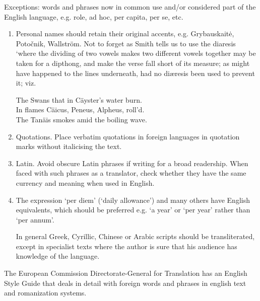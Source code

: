 Exceptions: words and phrases now in common use and/or considered part of
the English language, e.g. role, ad hoc, per capita, per se, etc.

\begin{enumerate}
\item Personal names should retain their original accents, e.g. Grybauskait\.{e},
Potočnik, Wallstr\"{o}m. Not to forget as Smith tells us to use the diaresis `where the dividing of two vowels makes two different vowels together may be taken for a dipthong, and make the verse fall short of its measure; as might have happened to the lines underneath, had no di\ae resis been used to prevent it; viz.

{\hskip3cm \narrower\narrower\it

 The Swans that in C\"ayster's water burn.\\
 In flames C\"aicus, Peneus, Alpheus, roll'd.\\
 The Tan\"ais smokes amid the boiling wave.\\

}

\item Quotations. Place verbatim quotations in foreign languages in quotation marks
without italicising the text.

\item Latin. Avoid obscure Latin phrases if writing for a broad readership. When
faced with such phrases as a translator, check whether they have the same
currency and meaning when used in English.

\item The expression `per diem' (`daily allowance') and many others have English
equivalents, which should be preferred e.g. `a year' or `per year' rather than `per annum'.

In general Greek, Cyrillic, Chinese or Arabic scripts should be transliterated, except in specialist texts where the author is sure that his audience has knowledge of the language.

\end{enumerate}

The European Commission Directorate-General for Translation has an English Style Guide that deals in detail with foreign words and phrases in english text and romanization systems.




















